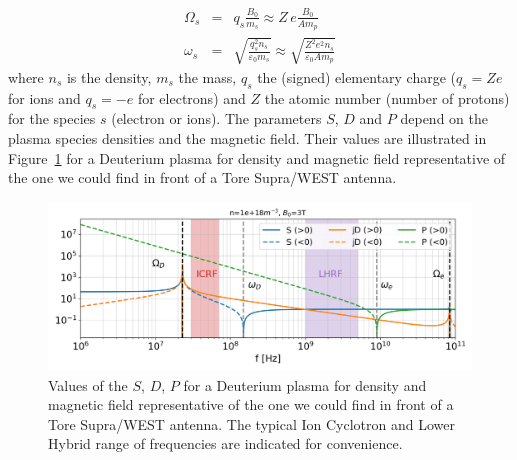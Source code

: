 \begin{subequations}
	\begin{eqnarray}
	\Omega_{s}  &=& q_s \frac{B_{0}}{m_{s}}
	\approx
	Z\, e \frac{B_{0}}{A m_{p}}
	\label{eq:cyclotron_angular_frequency} 
	\\
	\omega_{s}  &=& \sqrt{ \frac{q_s^2 n_{s}}{\varepsilon_{0} m_{s}} }
	\approx
	\sqrt{ \frac{Z^2 e^2 n_{s}}{\varepsilon_{0} A m_{p}}}
	\end{eqnarray}
\end{subequations}
where $n_s$ is the density, $m_s$ the mass, $q_s$ the (signed) elementary charge ($q_s=Ze$ for ions and $q_s=-e$ for electrons) and $Z$ the atomic number (number of protons) for the species $s$ (electron or ions). The parameters $S$, $D$ and $P$ depend on the plasma species densities and the magnetic field. Their values are illustrated in Figure~\ref{fig:sdpvsfnfixedbfixed} for a Deuterium plasma for density and magnetic field representative of the one we could find in front of a Tore Supra/WEST antenna.

\begin{figure}[h]
	\centering
	\includegraphics[width=1.0\linewidth]{figures/chap2/SDP_vs_f_nfixed_Bfixed}
	\caption{Values of the $S$, $D$, $P$ for a Deuterium plasma for density and magnetic field representative of the one we could find in front of a Tore Supra/WEST antenna. The typical Ion Cyclotron and Lower Hybrid range  of frequencies are indicated for convenience.}
	\label{fig:sdpvsfnfixedbfixed}
\end{figure}

